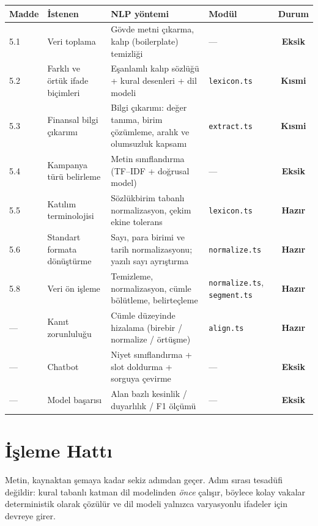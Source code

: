 \documentclass[11pt,a4paper]{article}
\newcommand{\Hazir}{\textcolor{hazir}{\textbf{Hazır}}}
\newcommand{\Kismi}{\textcolor{kismi}{\textbf{Kısmi}}}
\newcommand{\Eksik}{\textcolor{eksik}{\textbf{Eksik}}}
\newcommand{\dosya}[1]{\textcolor{kod}{\texttt{#1}}}
\begin{document}
\begin{longtable}{p{1.1cm} p{3.5cm} p{4.6cm} p{2.9cm} c}
\toprule
\textbf{Madde} & \textbf{İstenen} & \textbf{NLP yöntemi} & \textbf{Modül} & \textbf{Durum} \\
\midrule
\endhead
5.1 & Veri toplama & Gövde metni çıkarma, kalıp (boilerplate) temizliği & --- & \Eksik \\
5.2 & Farklı ve örtük ifade biçimleri & Eşanlamlı kalıp sözlüğü + kural desenleri + dil modeli & \dosya{lexicon.ts} & \Kismi \\
5.3 & Finansal bilgi çıkarımı & Bilgi çıkarımı: değer tanıma, birim çözümleme, aralık ve olumsuzluk kapsamı & \dosya{extract.ts} & \Kismi \\
5.4 & Kampanya türü belirleme & Metin sınıflandırma (TF--IDF + doğrusal model) & --- & \Eksik \\
5.5 & Katılım terminolojisi & Sözlükbirim tabanlı normalizasyon, çekim ekine tolerans & \dosya{lexicon.ts} & \Hazir \\
5.6 & Standart formata dönüştürme & Sayı, para birimi ve tarih normalizasyonu; yazılı sayı ayrıştırma & \dosya{normalize.ts} & \Hazir \\
5.8 & Veri ön işleme & Temizleme, normalizasyon, cümle bölütleme, belirteçleme & \dosya{normalize.ts}, \dosya{segment.ts} & \Hazir \\
--- & Kanıt zorunluluğu & Cümle düzeyinde hizalama (birebir / normalize / örtüşme) & \dosya{align.ts} & \Hazir \\
--- & Chatbot & Niyet sınıflandırma + slot doldurma + sorguya çevirme & --- & \Eksik \\
--- & Model başarısı & Alan bazlı kesinlik / duyarlılık / F1 ölçümü & --- & \Eksik \\
\bottomrule
\end{longtable}

\section{İşleme Hattı}
\label{sec:hat}

Metin, kaynaktan şemaya kadar sekiz adımdan geçer. Adım sırası tesadüfi
değildir: kural tabanlı katman dil modelinden \emph{önce} çalışır, böylece
kolay vakalar deterministik olarak çözülür ve dil modeli yalnızca varyasyonlu
ifadeler için devreye girer.
\end{document}
